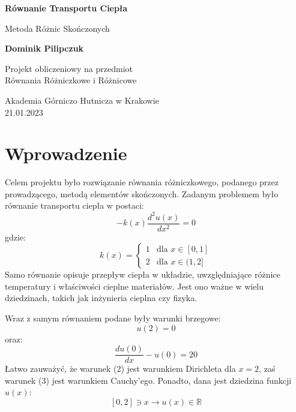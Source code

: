 \documentclass[12pt]{article}
\begin{document}
\begin{titlepage}
	\begin{center}
		\vspace*{1cm}
 
		{\huge \textbf{Równanie Transportu Ciepła}}
 
		\vspace{0.5cm}
		 Metoda Różnic Skończonych
			 
		\vspace{1.5cm}
 
		{\huge \textbf{Dominik Pilipczuk}}
 
		\vfill
			 
		Projekt obliczeniowy na przedmiot\\
		Równania Różniczkowe i Różnicowe
			 
		\vspace{0.8cm}
	
			 
		Akademia Górniczo Hutnicza w Krakowie\\
		21.01.2023
			 
	\end{center}
\end{titlepage}

\section{Wprowadzenie}
Celem projektu było rozwiązanie równania różniczkowego, podanego przez prowadzącego, metodą
 elementów skończonych. Zadanym problemem było równanie transportu ciepła w postaci:
\begin{equation}
	-k(x) \frac{d^2 u(x)}{dx^2} = 0
\end{equation}
gdzie:
\[
	k(x)=\begin{cases}
		1 & \text{dla $x \in [0,1]$}\\
		2 & \text{dla $x \in (1,2]$}
	  \end{cases}
\]
Samo równanie opisuje przepływ ciepła w układzie,
 uwzględniające różnice temperatury i właściwości cieplne materiałów. 
 Jest ono ważne w wielu dziedzinach, takich jak inżynieria cieplna czy fizyka.

\noindent Wraz z samym równaniem podane były warunki brzegowe:
\begin{equation}
	u(2)=0 
\end{equation}
oraz:
\begin{equation}
	\frac{du(0)}{dx} - u(0) = 20
\end{equation}
\noindent Łatwo zauważyć, że warunek (2) jest warunkiem Dirichleta dla $x = 2$, 
zaś warunek (3) jest warunkiem Cauchy'ego. Ponadto, dana jest dziedzina funkcji $u(x)$:
\[
	[0, 2] \ni x \to u(x) \in \mathbb{R}
\]
\end{document}
